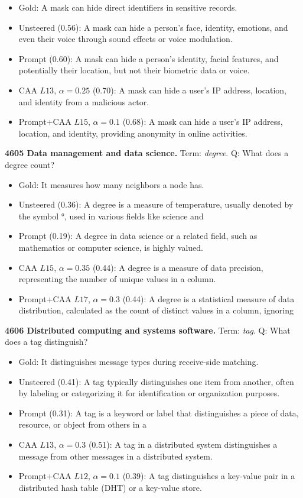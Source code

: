 \begin{itemize}\setlength{\itemsep}{0.15em}\setlength{\parsep}{0pt}\setlength{\topsep}{0.2em}
\item Gold: A mask can hide direct identifiers in sensitive records.
\item Unsteered (0.56): A mask can hide a person's face, identity, emotions, and even their voice through sound effects or voice modulation.
\item Prompt (0.60): A mask can hide a person's identity, facial features, and potentially their location, but not their biometric data or voice.
\item CAA $L13$, $\alpha=0.25$ (0.70): A mask can hide a user's IP address, location, and identity from a malicious actor.
\item Prompt+CAA $L15$, $\alpha=0.1$ (0.68): A mask can hide a user's IP address, location, and identity, providing anonymity in online activities.
\end{itemize}
\medskip\noindent\textbf{4605 Data management and data science.} Term: \emph{degree}.
Q: What does a degree count?
\begin{itemize}\setlength{\itemsep}{0.15em}\setlength{\parsep}{0pt}\setlength{\topsep}{0.2em}
\item Gold: It measures how many neighbors a node has.
\item Unsteered (0.36): A degree is a measure of temperature, usually denoted by the symbol °, used in various fields like science and
\item Prompt (0.19): A degree in data science or a related field, such as mathematics or computer science, is highly valued.
\item CAA $L15$, $\alpha=0.35$ (0.44): A degree is a measure of data precision, representing the number of unique values in a column.
\item Prompt+CAA $L17$, $\alpha=0.3$ (0.44): A degree is a statistical measure of data distribution, calculated as the count of distinct values in a column, ignoring
\end{itemize}
\medskip\noindent\textbf{4606 Distributed computing and systems software.} Term: \emph{tag}.
Q: What does a tag distinguish?
\begin{itemize}\setlength{\itemsep}{0.15em}\setlength{\parsep}{0pt}\setlength{\topsep}{0.2em}
\item Gold: It distinguishes message types during receive-side matching.
\item Unsteered (0.41): A tag typically distinguishes one item from another, often by labeling or categorizing it for identification or organization purposes.
\item Prompt (0.31): A tag is a keyword or label that distinguishes a piece of data, resource, or object from others in a
\item CAA $L13$, $\alpha=0.3$ (0.51): A tag in a distributed system distinguishes a message from other messages in a distributed system.
\item Prompt+CAA $L12$, $\alpha=0.1$ (0.39): A tag distinguishes a key-value pair in a distributed hash table (DHT) or a key-value store.
\end{itemize}
